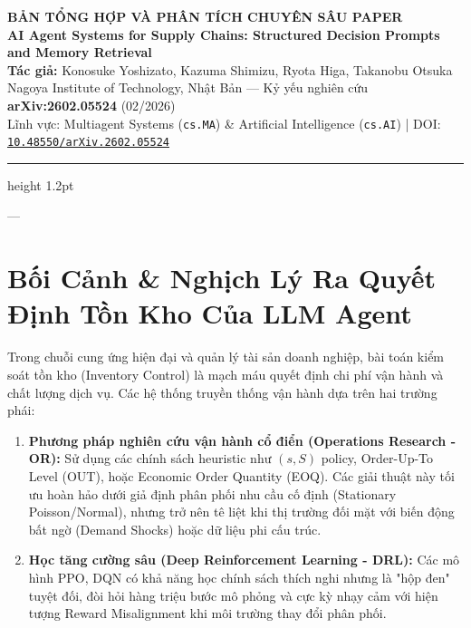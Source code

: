 \documentclass[11pt,a4paper]{article}
\begin{document}
\begin{center}
    {\Large\bfseries BẢN TỔNG HỢP VÀ PHÂN TÍCH CHUYÊN SÂU PAPER}\\[0.3cm]
    {\LARGE\bfseries AI Agent Systems for Supply Chains: Structured Decision Prompts and Memory Retrieval}\\[0.4cm]
    {\normalsize\textbf{Tác giả:} Konosuke Yoshizato, Kazuma Shimizu, Ryota Higa, Takanobu Otsuka}\\[0.15cm]
    {\small Nagoya Institute of Technology, Nhật Bản — Kỷ yếu nghiên cứu \textbf{arXiv:2602.05524} (02/2026)}\\[0.15cm]
    {\small Lĩnh vực: Multiagent Systems (\texttt{cs.MA}) \& Artificial Intelligence (\texttt{cs.AI}) \quad | \quad DOI: \href{https://doi.org/10.48550/arXiv.2602.05524}{\texttt{10.48550/arXiv.2602.05524}}}
\end{center}

\vspace{0.3cm}
\hrule height 1.2pt
\vspace{0.6cm}

---

\section{Bối Cảnh \& Nghịch Lý Ra Quyết Định Tồn Kho Của LLM Agent}

Trong chuỗi cung ứng hiện đại và quản lý tài sản doanh nghiệp, bài toán kiểm soát tồn kho (Inventory Control) là mạch máu quyết định chi phí vận hành và chất lượng dịch vụ. Các hệ thống truyền thống vận hành dựa trên hai trường phái:
\begin{enumerate}[leftmargin=1.8em]
    \item \textbf{Phương pháp nghiên cứu vận hành cổ điển (Operations Research - OR):} Sử dụng các chính sách heuristic như $(s, S)$ policy, Order-Up-To Level (OUT), hoặc Economic Order Quantity (EOQ). Các giải thuật này tối ưu hoàn hảo dưới giả định phân phối nhu cầu cố định (Stationary Poisson/Normal), nhưng trở nên tê liệt khi thị trường đối mặt với biến động bất ngờ (Demand Shocks) hoặc dữ liệu phi cấu trúc.
    \item \textbf{Học tăng cường sâu (Deep Reinforcement Learning - DRL):} Các mô hình PPO, DQN có khả năng học chính sách thích nghi nhưng là "hộp đen" tuyệt đối, đòi hỏi hàng triệu bước mô phỏng và cực kỳ nhạy cảm với hiện tượng Reward Misalignment khi môi trường thay đổi phân phối.
\end{enumerate}
\end{document}
